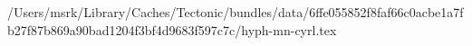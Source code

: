 /Users/msrk/Library/Caches/Tectonic/bundles/data/6ffe055852f8faf66c0acbe1a7fb27f87b869a90bad1204f3bf4d9683f597c7c/hyph-mn-cyrl.tex